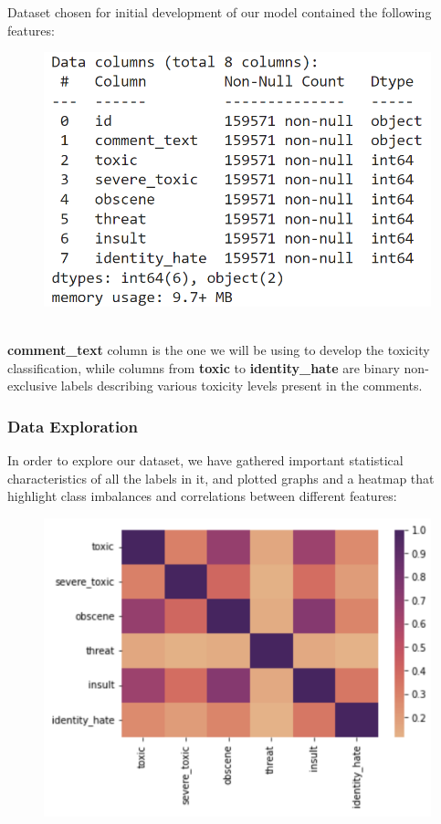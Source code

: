 \documentclass[]{article}
\begin{document}
	Dataset chosen for initial development of our model contained the following features:
	\begin{figure}[h]
		\includegraphics{screenshot1.png}
	\end{figure}\\
	\textbf{comment\_text} column is the one we will be using to develop the toxicity classification, while columns from \textbf{toxic} to \textbf{identity\_hate} are binary non-exclusive labels describing various toxicity levels present in the comments.
	
	\subsubsection{Data Exploration}
	
	In order to explore our dataset, we have gathered important statistical characteristics of all the labels in it, and plotted graphs and a heatmap that highlight class imbalances and correlations between different features:
	\begin{figure}[h]
		\includegraphics{screenshot2.png}
	\end{figure}\\
	
\end{document}
